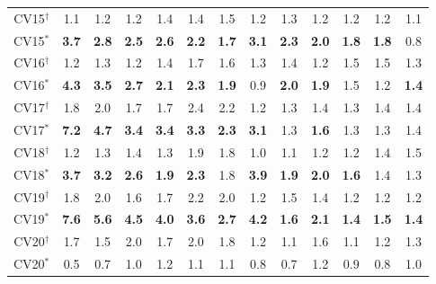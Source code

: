 \begin{table}[]
\begin{threeparttable}
\begin{tabular}{c|cccccc|cccccc}
\hline
CV15$^{\dag}$&1.1 &1.2 &1.2 &1.4 &1.4 &1.5 &1.2 &1.3 &1.2 &1.2 &1.2 &1.1 \\
CV15$^{*}$&\textbf{3.7} &\textbf{2.8} &\textbf{2.5} &\textbf{2.6} &\textbf{2.2} &\textbf{1.7} &\textbf{3.1} &\textbf{2.3} &\textbf{2.0} &\textbf{1.8} &\textbf{1.8} &0.8 \\
\hline
CV16$^{\dag}$&1.2 &1.3 &1.2 &1.4 &1.7 &1.6 &1.3 &1.4 &1.2 &1.5 &1.5 &1.3 \\
CV16$^{*}$&\textbf{4.3} &\textbf{3.5} &\textbf{2.7} &\textbf{2.1} &\textbf{2.3} &\textbf{1.9} &0.9 &\textbf{2.0} &\textbf{1.9} &1.5 &1.2 &\textbf{1.4} \\
\hline
CV17$^{\dag}$&1.8 &2.0 &1.7 &1.7 &2.4 &2.2 &1.2 &1.3 &1.4 &1.3 &1.4 &1.4 \\
CV17$^{*}$&\textbf{7.2} &\textbf{4.7} &\textbf{3.4} &\textbf{3.4} &\textbf{3.3} &\textbf{2.3} &\textbf{3.1} &1.3 &\textbf{1.6} &1.3 &1.3 &1.4 \\
\hline
CV18$^{\dag}$&1.2 &1.3 &1.4 &1.3 &1.9 &1.8 &1.0 &1.1 &1.2 &1.2 &1.4 &1.5 \\
CV18$^{*}$&\textbf{3.7} &\textbf{3.2} &\textbf{2.6} &\textbf{1.9} &\textbf{2.3} &1.8 &\textbf{3.9} &\textbf{1.9} &\textbf{2.0} &\textbf{1.6} &1.4 &1.3 \\
\hline
CV19$^{\dag}$&1.8 &2.0 &1.6 &1.7 &2.2 &2.0 &1.2 &1.5 &1.4 &1.2 &1.2 &1.2 \\
CV19$^{*}$&\textbf{7.6} &\textbf{5.6} &\textbf{4.5} &\textbf{4.0} &\textbf{3.6} &\textbf{2.7} &\textbf{4.2} &\textbf{1.6} &\textbf{2.1} &\textbf{1.4} &\textbf{1.5} &\textbf{1.4} \\
\hline
CV20$^{\dag}$&1.7 &1.5 &2.0 &1.7 &2.0 &1.8 &1.2 &1.1 &1.6 &1.1 &1.2 &1.3 \\
CV20$^{*}$&0.5 &0.7 &1.0 &1.2 &1.1 &1.1 &0.8 &0.7 &1.2 &0.9 &0.8 &1.0 \\

\bottomrule
\end{tabular}
\end{threeparttable}
\end{table}




%	


